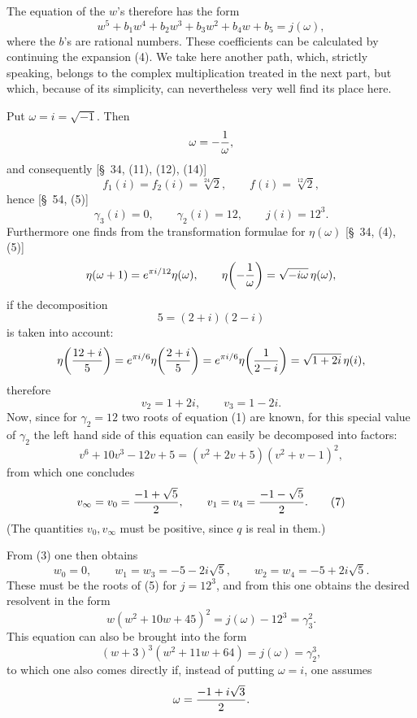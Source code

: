 \documentclass[11pt]{article}
\begin{document}
The equation of the \(w\)'s therefore has the form
\begin{equation}
 w^5+b_1w^4+b_2w^3+b_3w^2+b_4w+b_5=j(\omega),
\tag{5}
\end{equation}
where the \(b\)'s are rational numbers. These coefficients can be calculated by continuing the expansion (4). We take here another path, which, strictly speaking, belongs to the complex multiplication treated in the next part, but which, because of its simplicity, can nevertheless very well find its place here.

Put \(\omega=i=\sqrt{-1}\). Then
\[
 \omega=-{1\over\omega},
\]
and consequently [\S~34, (11), (12), (14)]
\[
 f_1(i)=f_2(i)=\sqrt[24]{2},\qquad f(i)=\sqrt[12]{2},
\]
hence [\S~54, (5)]
\begin{equation}
 \gamma_3(i)=0,\qquad \gamma_2(i)=12,\qquad j(i)=12^3.
\tag{6}
\end{equation}
Furthermore one finds from the transformation formulae for \(\eta(\omega)\) [\S~34, (4), (5)]
\[
 \eta(\omega+1)=e^{\pi i/12}\eta(\omega),
 \qquad
 \eta\!\left(-{1\over\omega}\right)=\sqrt{-i\omega}\,\eta(\omega),
\]
if the decomposition
\[
5=(2+i)(2-i)
\]
is taken into account:
\[
 \eta\!\left({12+i\over5}\right)
 =e^{\pi i/6}\eta\!\left({2+i\over5}\right)
 =e^{\pi i/6}\eta\!\left({1\over2-i}\right)
 =\sqrt{1+2i}\,\eta(i),
\]
therefore
\[
 v_2=1+2i,\qquad v_3=1-2i.
\]
Now, since for \(\gamma_2=12\) two roots of equation (1) are known, for this special value of \(\gamma_2\) the left hand side of this equation can easily be decomposed into factors:
\[
 v^6+10v^3-12v+5=(v^2+2v+5)(v^2+v-1)^2,
\]
from which one concludes
\begin{equation}
 v_\infty=v_0={-1+\sqrt5\over2},\qquad
 v_1=v_4={-1-\sqrt5\over2}.
\tag{7}
\end{equation}
(The quantities \(v_0,v_\infty\) must be positive, since \(q\) is real in them.)

From (3) one then obtains
\begin{equation}
 w_0=0,\qquad
 w_1=w_3=-5-2i\sqrt5,\qquad
 w_2=w_4=-5+2i\sqrt5.
\tag{8}
\end{equation}
These must be the roots of (5) for \(j=12^3\), and from this one obtains the desired resolvent in the form
\begin{equation}
 w(w^2+10w+45)^2=j(\omega)-12^3=\gamma_3^2.
\tag{9}
\end{equation}
This equation can also be brought into the form
\begin{equation}
 (w+3)^3(w^2+11w+64)=j(\omega)=\gamma_2^3,
\tag{10}
\end{equation}
to which one also comes directly if, instead of putting \(\omega=i\), one assumes
\[
 \omega={-1+i\sqrt3\over2}.
\]
\end{document}
